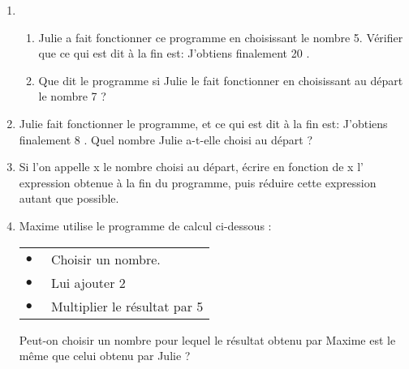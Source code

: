 \begin{enumerate}
\item 
	\begin{enumerate}
		\item Julie a fait fonctionner ce programme en choisissant le nombre 5. Vérifier que
ce qui est dit à la fin est: \og J'obtiens finalement 20 \fg.
		\item Que dit le programme si Julie le fait fonctionner
en choisissant au départ le nombre 7 ?
	\end{enumerate}
\item Julie fait fonctionner le programme, et ce qui est dit à
la fin est: \og J'obtiens finalement 8 \fg.
Quel nombre Julie a-t-elle choisi au départ ?
\item Si l'on appelle x le nombre choisi au départ, écrire en
fonction de x l' expression obtenue à la fin du programme, puis réduire cette expression autant que
possible.
\item Maxime utilise le programme de calcul ci-dessous :
\begin{center}	
\begin{tabularx}{0.5\linewidth}{|l X|}\hline
$\bullet~~$&Choisir un nombre.\\
$\bullet~~$&Lui ajouter 2\\
$\bullet~~$&Multiplier le résultat par 5\\\hline
\end{tabularx}
\end{center}

Peut-on choisir un nombre pour lequel le résultat obtenu par Maxime est le même que celui obtenu par
Julie ?	
\end{enumerate}

\bigskip
 
